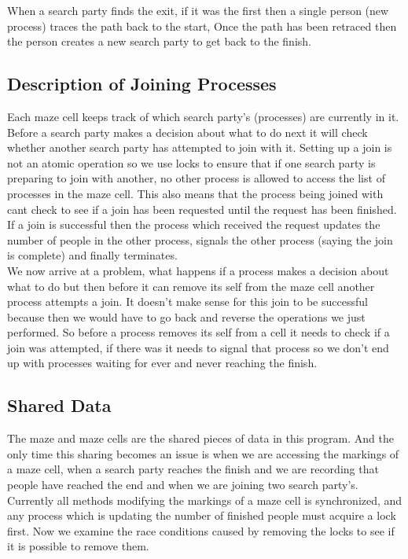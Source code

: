 \documentclass[a4paper, 12pt]{article}
\begin{document}
			When a search party finds the exit, if it was the first then a single person (new process) traces the path back to the start, Once the path has been retraced then the person creates a new search party to get back to the finish.
		
		\subsection{Description of Joining Processes}
			Each maze cell keeps track of which search party's (processes) are currently in it. Before a search party makes a decision about what to do next it will check whether another search party has attempted to join with it. Setting up a join is not an atomic operation so we use locks to ensure that if one search party is preparing to join with another, no other process is allowed to access the list of processes in the maze cell. This also means that the process being joined with cant check to see if a join has been requested until the request has been finished.\\
			
			If a join is successful then the process which received the request updates the number of people in the other process, signals the other process (saying the join is complete) and finally terminates.\\
			
			We now arrive at a problem, what happens if a process makes a decision about what to do but then before it can remove its self from the maze cell another process attempts a join. It doesn't make sense for this join to be successful because then we would have to go back and reverse the operations we just performed. So before a process removes its self from a cell it needs to check if a join was attempted, if there was it needs to signal that process so we don't end up with processes waiting for ever and never reaching the finish.
			
		\subsection{Shared Data}
			The maze and maze cells are the shared pieces of data in this program. And the only time this sharing becomes an issue is when we are accessing the markings of a maze cell, when a search party reaches the finish and we are recording that people have reached the end and when we are joining two search party's. Currently all methods modifying the markings of a maze cell is synchronized, and any process which is updating the number of finished people must acquire a lock first. Now we examine the race conditions caused by removing the locks to see if it is possible to remove them.
			
\end{document}
